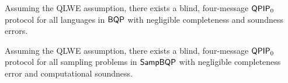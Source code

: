 \begin{thm}
    Assuming the QLWE assumption, there exists a blind, four-message $\operatorname{\mathsf{QPIP}}_0$ protocol for all languages in $\operatorname{\mathsf{BQP}}$ with negligible completeness and soundness errors.
\end{thm}

\begin{thm}
        Assuming the QLWE assumption, there exists a blind, four-message $\operatorname{\mathsf{QPIP}}_0$ protocol for all sampling problems in $\operatorname{\mathsf{SampBQP}}$ with negligible completeness error and computational soundness.
\end{thm}


